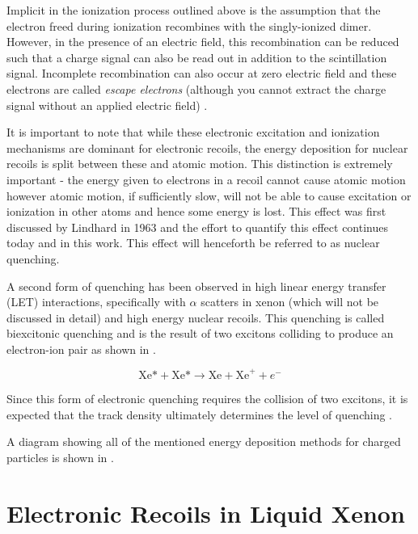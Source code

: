 Implicit in the ionization process outlined above is the assumption that the electron freed during ionization recombines with the singly-ionized dimer.  However, in the presence of an electric field, this recombination can be reduced such that a charge signal can also be read out in addition to the scintillation signal.  Incomplete recombination can also occur at zero electric field and these electrons are called \textit{escape electrons} (although you cannot extract the charge signal without an applied electric field) \cite{doke2002absolute}.


It is important to note that while these electronic excitation and ionization mechanisms are dominant for electronic recoils, the energy deposition for nuclear recoils is split between these and atomic motion.  This distinction is extremely important - the energy given to electrons in a recoil cannot cause atomic motion however atomic motion, if sufficiently slow, will not be able to cause excitation or ionization in other atoms and hence some energy is lost.  This effect was first discussed by Lindhard in 1963 \cite{lindhard1963integral} and the effort to quantify this effect continues today and in this work.  This effect will henceforth be referred to as nuclear quenching.

A second form of quenching has been observed in high linear energy transfer (LET) interactions, specifically with $\alpha$ scatters in xenon (which will not be discussed in detail) and high energy nuclear recoils.  This quenching is called biexcitonic quenching and is the result of two excitons colliding to produce an electron-ion pair as shown in .

\begin{equation}
        \label{eqn:biexcitonic_quenching} 
        \textrm{Xe*} + \textrm{Xe*} \rightarrow \textrm{Xe} + \textrm{Xe}^+ + e^-
\end{equation}

Since this form of electronic quenching requires the collision of two excitons, it is expected that the track density ultimately determines the level of quenching \cite{hitachi2005properties}.

A diagram showing all of the mentioned energy deposition methods for charged particles is shown in .



\section{Electronic Recoils in Liquid Xenon}
\label{sec:lxe_er}

